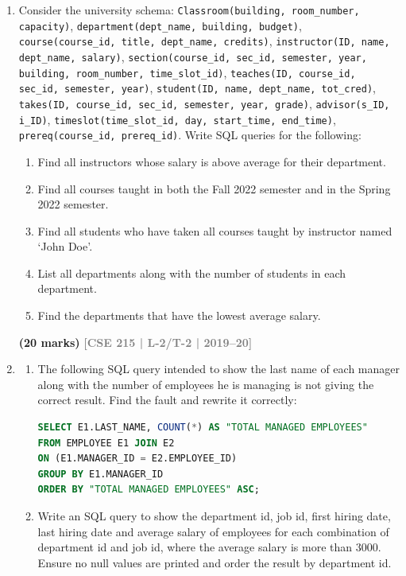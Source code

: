 \documentclass[12pt]{article}
\newcommand{\yr}[1]{\hfill\textcolor{gray}{\small\textbf{[#1]}}}
\newcommand{\mk}[1]{\textcolor{orange!70!black}{\small\textbf{(#1 marks)}}}
\begin{document}
\begin{enumerate}
\item Consider the university schema: \texttt{Classroom(building, room\_number, capacity)}, \texttt{department(dept\_name, building, budget)}, \texttt{course(course\_id, title, dept\_name, credits)}, \texttt{instructor(ID, name, dept\_name, salary)}, \texttt{section(course\_id, sec\_id, semester, year, building, room\_number, time\_slot\_id)}, \texttt{teaches(ID, course\_id, sec\_id, semester, year)}, \texttt{student(ID, name, dept\_name, tot\_cred)}, \texttt{takes(ID, course\_id, sec\_id, semester, year, grade)}, \texttt{advisor(s\_ID, i\_ID)}, \texttt{timeslot(time\_slot\_id, day, start\_time, end\_time)}, \texttt{prereq(course\_id, prereq\_id)}. Write SQL queries for the following:
\begin{enumerate}
  \item Find all instructors whose salary is above average for their department.
  \item Find all courses taught in both the Fall 2022 semester and in the Spring 2022 semester.
  \item Find all students who have taken all courses taught by instructor named `John Doe'.
  \item List all departments along with the number of students in each department.
  \item Find the departments that have the lowest average salary.
\end{enumerate}
\mk{20} \yr{CSE 215 | L-2/T-2 | 2019--20}


\item 
\begin{enumerate}

\item  The following SQL query intended to show the last name of each manager along with the number of employees he is managing is not giving the correct result. Find the fault and rewrite it correctly:
\begin{lstlisting}[language=SQL]
SELECT E1.LAST_NAME, COUNT(*) AS "TOTAL MANAGED EMPLOYEES"
FROM EMPLOYEE E1 JOIN E2
ON (E1.MANAGER_ID = E2.EMPLOYEE_ID)
GROUP BY E1.MANAGER_ID
ORDER BY "TOTAL MANAGED EMPLOYEES" ASC;
\end{lstlisting}

\item  Write an SQL query to show the department id, job id, first hiring date, last hiring date and average salary of employees for each combination of department id and job id, where the average salary is more than 3000. Ensure no null values are printed and order the result by department id.


\end{enumerate}
\end{enumerate}
\end{document}

